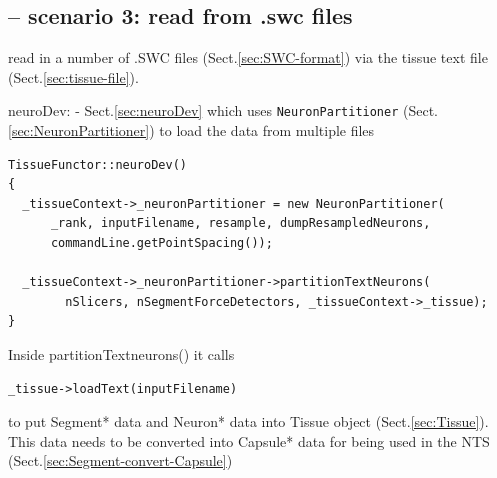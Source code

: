 % 


\subsection{-- scenario 3: read from .swc files}
\label{sec:touch-detection-TissueFunctor}

read in a number of .SWC files (Sect.\ref{sec:SWC-format}) via the tissue text
file (Sect.\ref{sec:tissue-file}).

  


neuroDev: - Sect.\ref{sec:neuroDev}  which uses \verb!NeuronPartitioner!
(Sect.\ref{sec:NeuronPartitioner}) to load the data from multiple files
\begin{verbatim}
TissueFunctor::neuroDev()
{
  _tissueContext->_neuronPartitioner = new NeuronPartitioner(
      _rank, inputFilename, resample, dumpResampledNeurons,
      commandLine.getPointSpacing());

  _tissueContext->_neuronPartitioner->partitionTextNeurons(
        nSlicers, nSegmentForceDetectors, _tissueContext->_tissue);
}
\end{verbatim}

Inside partitionTextneurons() it calls
\begin{verbatim}
_tissue->loadText(inputFilename)
\end{verbatim}
to put Segment* data and Neuron* data into Tissue object
(Sect.\ref{sec:Tissue}).
This data needs to be converted into Capsule* data for being used in the NTS
(Sect.\ref{sec:Segment-convert-Capsule})

